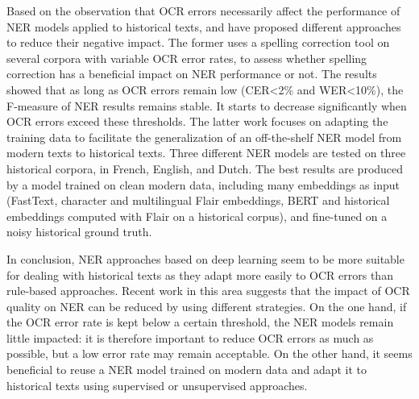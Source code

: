 Based on the observation that OCR errors necessarily affect the performance of NER models applied to historical texts, \cite{huynh2020use} and \cite{marz2021data} have proposed different approaches to reduce their negative impact. The former uses a spelling correction tool on several corpora with variable OCR error rates, to assess whether spelling correction has a beneficial impact on NER performance or not. The results showed that as long as OCR errors remain low (CER<2\% and WER<10\%), the F-measure of NER results remains stable. It starts to decrease significantly when OCR errors exceed these thresholds. The latter work focuses on adapting the training data to facilitate the generalization of an off-the-shelf NER model from modern texts to historical texts. Three different NER models are tested on three historical corpora, in French, English, and Dutch. The best results are produced by a model trained on clean modern data, including many  embeddings as input (FastText, character and multilingual Flair embeddings, BERT and historical embeddings computed with Flair on a historical corpus), and fine-tuned on a noisy historical ground truth.

In conclusion, NER approaches based on deep learning seem to be more suitable for dealing with historical texts as they adapt more easily to OCR errors than rule-based approaches. Recent work in this area suggests that the impact of OCR quality on NER can be reduced by using different strategies. On the one hand, if the OCR error rate is kept below a certain threshold, the NER models remain little impacted: it is therefore important to reduce OCR errors as much as possible, but a low error rate may remain acceptable. On the other hand, it seems beneficial to reuse a NER model trained on modern data and adapt it to historical texts using supervised or unsupervised approaches. 





